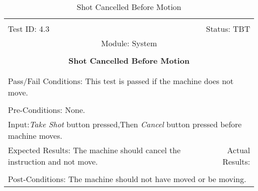 \documentclass[titlepage]{article}
\begin{document}
\begin{center}%
\begin{table}
\begin{tabular}{|l r|}\hline&\\[-2mm]
	Test ID: 4.3	&Status: TBT\\[-3mm]
	\multicolumn{2}{|c|}{Module: System}\\&\\
	\multicolumn{2}{|c|}{\textbf{\large{Shot Cancelled Before Motion}}}\\&\\\hline&\\[-3mm]
	\multicolumn{2}{|p{\textwidth}|}{Pass/Fail Conditions: This test is passed if the machine does not move.}\\[1mm]\hline&\\[-3mm]
	\multicolumn{2}{|p{\textwidth}|}{Pre-Conditions: None.}\\[4mm]
	\multicolumn{2}{|p{\textwidth}|}{Input:\newline\textit{Take Shot} button pressed,\newline Then \textit{Cancel} button pressed before machine moves.}\\[2mm]\hline
	\multicolumn{1}{|p{0.49\textwidth}}{Expected Results: The machine should cancel the instruction and not move.}	&\multicolumn{1}{|p{0.45\textwidth}|}{Actual Results: }\\\hline&\\[-3mm]
	\multicolumn{2}{|p{\textwidth}|}{Post-Conditions: The machine should not have moved or be moving.}\\\hline
\end{tabular}
\caption{Shot Cancelled Before Motion}
\end{table}
\end{center}
\end{document}
